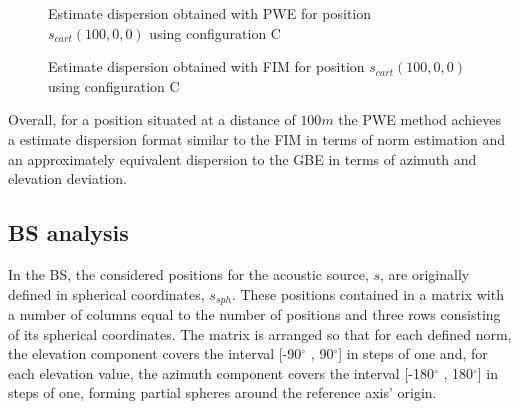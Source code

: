 \begin{figure}[!htbp]
	\captionsetup{justification=centering,margin=2cm}
	\caption{Estimate dispersion obtained with PWE for position $s_{cart}(100,0,0)$ using configuration C}
	\label{fig:SS-estimB-C-100,0,0}
\end{figure}

\begin{figure}[!htbp]
	\captionsetup{justification=centering,margin=2cm}
	\caption{Estimate dispersion obtained with FIM for position $s_{cart}(100,0,0)$ using configuration C}
	\label{fig:SS-fim-C-100,0,0}
\end{figure}

Overall, for a position situated at a distance of $100m$ the PWE method achieves a estimate dispersion format similar to the FIM in terms of norm estimation and an approximately equivalent dispersion to the GBE in terms of azimuth and elevation deviation.

\subsection{BS analysis}

In the BS, the considered positions for the acoustic source, $s$, are originally defined in spherical coordinates, $s_{sph}$. These positions contained in a matrix with a number of columns equal to the number of positions and three rows consisting of its spherical coordinates. The matrix is arranged so that for each defined norm, the elevation component covers the interval [-90$^{\circ}$ , 90$^{\circ}$] in steps of one and, for each elevation value, the azimuth component covers the interval [-180$^{\circ}$ , 180$^{\circ}$] in steps of one, forming partial spheres around the reference axis' origin.

